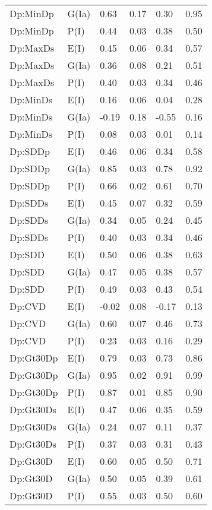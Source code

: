 \begin{center}
\begin{longtable}{|p{1.1in}|p{0.7in}|p{0.7in}|p{0.6in}|p{0.6in}|p{0.6in}|}
  Dp:MinDp & G(Ia) & 0.63 & 0.17 & 0.30 & 0.95 \\ 
  Dp:MinDp & P(I) & 0.44 & 0.03 & 0.38 & 0.50 \\ 
  Dp:MaxDs & E(I) & 0.45 & 0.06 & 0.34 & 0.57 \\ 
  Dp:MaxDs & G(Ia) & 0.36 & 0.08 & 0.21 & 0.51 \\ 
  Dp:MaxDs & P(I) & 0.40 & 0.03 & 0.34 & 0.46 \\ 
  Dp:MinDs & E(I) & 0.16 & 0.06 & 0.04 & 0.28 \\ 
  Dp:MinDs & G(Ia) & -0.19 & 0.18 & -0.55 & 0.16 \\ 
  Dp:MinDs & P(I) & 0.08 & 0.03 & 0.01 & 0.14 \\ 
  Dp:SDDp & E(I) & 0.46 & 0.06 & 0.34 & 0.58 \\ 
  Dp:SDDp & G(Ia) & 0.85 & 0.03 & 0.78 & 0.92 \\ 
  Dp:SDDp & P(I) & 0.66 & 0.02 & 0.61 & 0.70 \\ 
  Dp:SDDs & E(I) & 0.45 & 0.07 & 0.32 & 0.59 \\ 
  Dp:SDDs & G(Ia) & 0.34 & 0.05 & 0.24 & 0.45 \\ 
  Dp:SDDs & P(I) & 0.40 & 0.03 & 0.34 & 0.46 \\ 
  Dp:SDD & E(I) & 0.50 & 0.06 & 0.38 & 0.63 \\ 
  Dp:SDD & G(Ia) & 0.47 & 0.05 & 0.38 & 0.57 \\ 
  Dp:SDD & P(I) & 0.49 & 0.03 & 0.43 & 0.54 \\ 
  Dp:CVD & E(I) & -0.02 & 0.08 & -0.17 & 0.13 \\ 
  Dp:CVD & G(Ia) & 0.60 & 0.07 & 0.46 & 0.73 \\ 
  Dp:CVD & P(I) & 0.23 & 0.03 & 0.16 & 0.29 \\ 
  Dp:Gt30Dp & E(I) & 0.79 & 0.03 & 0.73 & 0.86 \\ 
  Dp:Gt30Dp & G(Ia) & 0.95 & 0.02 & 0.91 & 0.99 \\ 
  Dp:Gt30Dp & P(I) & 0.87 & 0.01 & 0.85 & 0.90 \\ 
  Dp:Gt30Ds & E(I) & 0.47 & 0.06 & 0.35 & 0.59 \\ 
  Dp:Gt30Ds & G(Ia) & 0.24 & 0.07 & 0.11 & 0.37 \\ 
  Dp:Gt30Ds & P(I) & 0.37 & 0.03 & 0.31 & 0.43 \\ 
  Dp:Gt30D & E(I) & 0.60 & 0.05 & 0.50 & 0.71 \\ 
  Dp:Gt30D & G(Ia) & 0.50 & 0.05 & 0.39 & 0.61 \\ 
  Dp:Gt30D & P(I) & 0.55 & 0.03 & 0.50 & 0.60 \\ 

\end{longtable}
\end{center}
